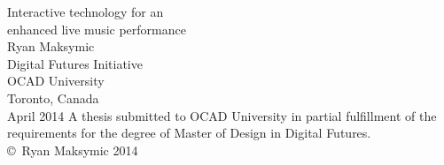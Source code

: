 \begin{titlepage}

\begin{center}

\LARGE{Interactive technology for an\\
enhanced live music performance}\\[2cm]
\large{Ryan Maksymic\\[1cm]
Digital Futures Initiative\\
OCAD University\\
Toronto, Canada\\[1cm]
April 2014
\vfill
A thesis submitted to OCAD University in partial fulfillment of the requirements for the degree of 
Master of Design in Digital Futures.\\[1cm]
\copyright\ Ryan Maksymic 2014}
\end{center}

\end{titlepage}